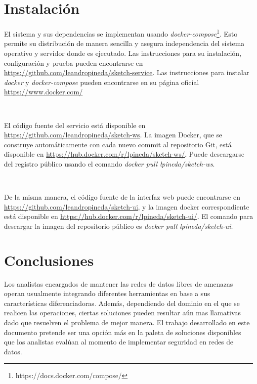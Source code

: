\documentclass[a4paper,12pt, oneside]{article}
\begin{document}
\section{Instalación}
El sistema y sus dependencias se implementan usando \textit{docker-compose}\footnote{https://docs.docker.com/compose/}. Esto permite su distribución de manera sencilla y asegura independencia del sistema operativo y servidor donde es ejecutado. Las instrucciones para su instalación, configuración y prueba pueden encontrarse en \hyperref[https://github.com/leandropineda/sketch-service]{https://github.com/leandropineda/sketch-service}. Las instrucciones para instalar \textit{docker} y \textit{docker-compose} pueden encontrarse en su página oficial \hyperref[https://www.docker.com/]{https://www.docker.com/}

\

El código fuente del servicio está disponible en \hyperref[https://github.com/leandropineda/sketch-ws]{https://github.com/leandropineda/sketch-ws}. La imagen Docker, que se construye automáticamente con cada nuevo commit al repositorio Git, está disponible en \hyperref[https://hub.docker.com/r/lpineda/sketch-ws/]{https://hub.docker.com/r/lpineda/sketch-ws/}. Puede descargarse del registro público usando el comando \textit{docker pull lpineda/sketch-ws}.

\

De la misma manera, el código fuente de la interfaz web puede encontrarse en \hyperref[https://github.com/leandropineda/sketch-ui]{https://github.com/leandropineda/sketch-ui}, y la imagen docker correspondiente está disponible en \hyperref[https://hub.docker.com/r/lpineda/sketch-ui/]{https://hub.docker.com/r/lpineda/sketch-ui/}. El comando para descargar la imagen del repositorio público es \textit{docker pull lpineda/sketch-ui}.


\clearpage
\section{Conclusiones}
Los analistas encargados de mantener las redes de datos libres de amenazas operan usualmente integrando diferentes herramientas en base a sus características diferenciadoras. Además, dependiendo del dominio en el que se realicen las operaciones, ciertas soluciones pueden resultar aún mas llamativas dado que resuelven el problema de mejor manera. El trabajo desarrollado en este documento pretende ser una opción más en la paleta de soluciones disponibles que los analistas evalúan al momento de implementar seguridad en redes de datos.
\end{document}

